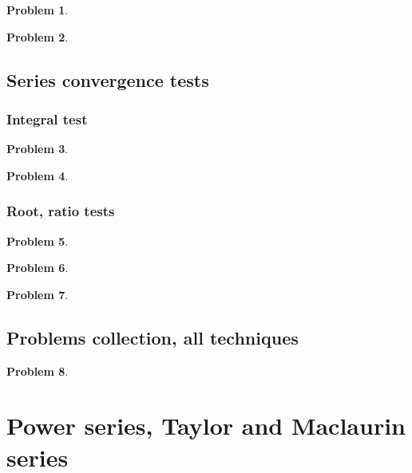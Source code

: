 \documentclass{article}
\newtheorem{problem}{Problem}
\begin{document}
\begin{problem}

\end{problem}
\begin{problem}

\end{problem}


\subsection{Series convergence tests}
\subsubsection{Integral test}
\begin{problem}

\end{problem}
\begin{problem}

\end{problem}
\subsubsection{Root, ratio tests}
\begin{problem}

\end{problem}
\begin{problem}

\end{problem}


\begin{problem}

\end{problem}
\subsection{Problems collection, all techniques}
\begin{problem}

\end{problem}

\section{Power series, Taylor and Maclaurin series}
\end{document}

